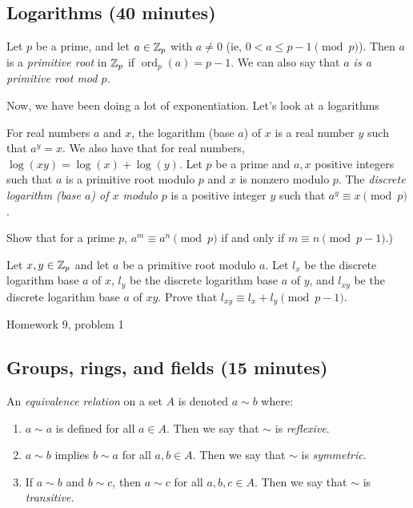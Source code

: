 \documentclass[letterpaper, 11 pt]{article}
\newcommand{\ord}{\operatorname{ord}}
\begin{document}
\subsection{Logarithms (40 minutes)}
\begin{defn}
 Let $p$ be a prime, and let $a\in \mathbb Z_p$ with $a\neq 0$ (ie, $0<a\leq p-1 \pmod p$). Then $a$ is a \emph{primitive root} in $\mathbb Z_p$ if $\ord_p(a)=p-1$. We can also say that \emph{$a$ is a primitive root mod $p$.}
\end{defn}

Now, we have been doing a lot of exponentiation. Let's look at a logarithms
\begin{defn} For real numbers $a$ and $x$, the logarithm (base $a$) of $x$ is a real number $y$ such that $a^y=x$.
We also have that for real numbers, $\log(xy)=\log(x)+\log(y)$. 
Let $p$ be a prime and $a,x$ positive integers such that $a$ is a primitive root modulo $p$ and $x$ is nonzero modulo $p$. The \emph{discrete logarithm (base $a$) of $x$ modulo $p$} is a positive integer $y$ such that $a^y\equiv x \pmod p$.
\end{defn}
\begin{br}
Show that for a prime $p$, $a^m\equiv a^n \pmod p$ if and only if $m\equiv n \pmod{p-1}$.)
\end{br}
\begin{br}[5 minutes]
 Let $x,y\in \mathbb Z_p$ and let $a$ be a primitive root modulo $a$. Let $l_x$ be the discrete logarithm base $a$ of $x$, $l_y$ be the discrete logarithm base $a$ of $y$, and $l_{xy}$ be the discrete logarithm base $a$ of $xy$.  Prove that $l_{xy}\equiv l_x+l_y \pmod{p-1}$. 
\end{br}
\begin{solution}
 Homework 9, problem 1
\end{solution}

\subsection{Groups, rings, and fields (15 minutes)}


\begin{defn}
 An \emph{equivalence relation }on a set $A$ is denoted $a\sim b$ where:
 \begin{enumerate}
 \item $a\sim a$ is defined for all $a\in A$. Then we say that $\sim$ is \emph{reflexive}.
 \item $a\sim b$ implies $b\sim a$ for all $a,b\in A$. Then we say that $\sim$ is \emph{symmetric}.
 \item If $a\sim b$ and $b\sim c$, then $a\sim c$ for all $a,b,c\in A$. Then we say that $\sim$ is \emph{transitive}.
\end{enumerate}
\end{defn}
\end{document}
